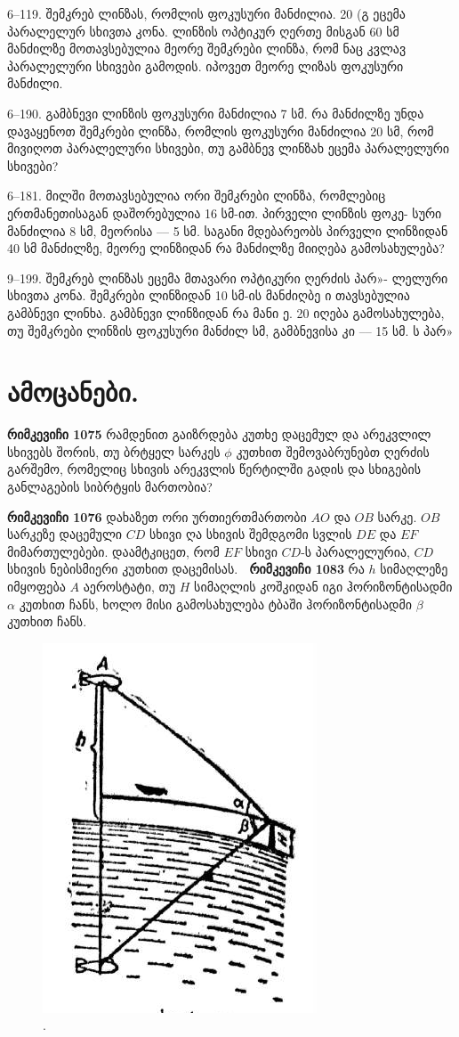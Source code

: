 \documentclass[a4paper]{book}
\begin{document}
6--119. შემკრებ ლინზას, რომლის ფოკუსური მანძილია. 20 (გ
ეცემა პარალელურ სხივთა კონა. ლინზის ოპტიკურ ღერთე მისგან
60 სმ მანძილზე მოთავსებულია მეორე შემკრები ლინზა, რომ
ნაც კვლავ პარალელური სხივები გამოდის. იპოვეთ მეორე ლიზას
ფოკუსური მანძილი.

6--190. გამბნევი ლინზის ფოკუსური მანძილია 7 სმ. რა მანძილზე
უნდა დავაყენოთ შემკრები ლინზა, რომლის ფოკუსური მანძილია 20
სმ, რომ მივიღოთ პარალელური სხივები, თუ გამბნევ ლინზახ ეცემა
პარალელური სხივები?

6--181. მილში მოთავსებულია ორი შემკრები ლინზა, რომლებიც
ერთმანეთისაგან დაშორებულია 16 სმ-ით. პირველი ლინზის ფოკე-
სური მანძილია 8 სმ, მეორისა –– 5 სმ. საგანი მდებარეობს პირველი
ლინზიდან 40 სმ მანძილზე, მეორე ლინზიდან რა მანძილზე მიიღება
გამოსახულება?

9--199. შემკრებ ლინზას ეცემა მთავარი ოპტიკური ღერძის პარ»-
ლელური სხივთა კონა. შემკრები ლინზიდან 10 სმ-ის მანძიღბე ი
თავსებულია გამბნევი ლინხა. გამბნევი ლინზიდან რა მანი ე. 20
იღება გამოსახულება, თუ შემკრები ლინზის ფოკუსური მანძილ
სმ, გამბნევისა კი –– 15 სმ. ს პარ»

\section{ამოცანები.}

\textbf{რიმკევიჩი 1075} რამდენით გაიზრდება კუთხე დაცემულ და არეკვლილ სხივებს შორის, თუ ბრტყელ სარკეს $\phi$ კუთხით შემოვაბრუნებთ ღერძის გარშემო, რომელიც სხივის არეკვლის წერტილში გადის და სხიგების განლაგების სიბრტყის მართობია?

\textbf{რიმკევიჩი 1076} დახაზეთ ორი ურთიერთმართობი $AO$ და $OB$ სარკე. $OB$ სარკეზე დაცემული $CD$ სხივი ღა სხივის შემდგომი სვლის $DE$ და $EF$ მიმართულებები. დაამტკიცეთ, რომ $EF$ სხივი $CD$-ს პარალელურია, $CD$ სხივის ნებისმიერი კუთხით დაცემისას.

\textbf{რიმკევიჩი 1083} რა $h$ სიმაღლეზე იმყოფება $A$ აეროსტატი, თუ $H$ სიმაღლის კოშკიდან იგი ჰორიზონტისადმი $\alpha$ კუთხით ჩანს, ხოლო მისი გამოსახულება ტბაში ჰორიზონტისადმი $\beta$ კუთხით ჩანს.
		\begin{figure}[h]
		   \centering
           \includegraphics[width=0.5\columnwidth]{figures/1083}
           \caption{.}
           \label{fig:1083}
        \end{figure}
\end{document}

